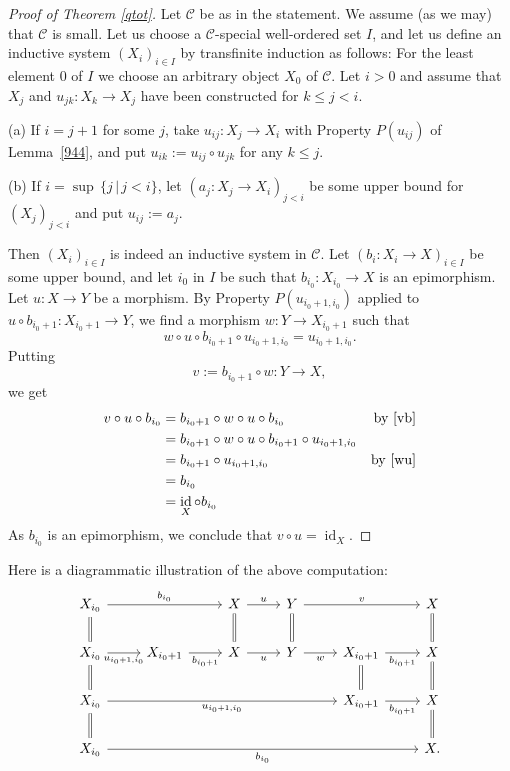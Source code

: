 \documentclass[12pt]{article}%
\theoremstyle{remark}
\theoremstyle{definition}
\newcommand{\nn}{\noindent}
\newcommand{\C}{\mathcal C}
\DeclareMathOperator{\id}{id}
\begin{document}
\begin{proof}[Proof of Theorem \ref{qtot}]
Let $\C$ be as in the statement. We assume (as we may) that $\C$ is small. Let us choose a $\C$-special well-ordered set $I$, and let us define an inductive system $(X_i)_{i\in I}$ by transfinite induction as follows: For the least element $0$ of $I$ we choose an arbitrary object $X_0$ of $\C$. Let $i>0$ and assume that $X_j$ and $u_{jk}:X_k\to X_j$ have been constructed for $k\le j<i$. 

\nn(a) If $i=j+1$ for some $j$, take $u_{ij}:X_j\to X_i$ with Property $P(u_{ij})$ of Lemma~\ref{944}, and put $u_{ik}:=u_{ij}\circ u_{jk}$ for any $k\le j$.

\nn(b) If $i=\sup\,\{j\,|\,j<i\}$, let $(a_j:X_j\to X_i)_{j<i}$ be some upper bound for $(X_j)_{j<i}$ and put $u_{ij}:=a_j$. 

Then $(X_i)_{i\in I}$ is indeed an inductive system in $\C$. Let $(b_i:X_i\to X)_{i\in I}$ be some upper bound, and let $i_0$ in $I$ be such that $b_{i_0}:X_{i_0}\to X$ is an epimorphism. Let $u:X\to Y$ be a morphism. By Property $P(u_{i_0+1,i_0})$ applied to $u\circ b_{i_0+1}:X_{i_0+1}\to Y$, we find a morphism $w:Y\to X_{i_0+1}$ such that 
%
\begin{equation}\label{wu}
w\circ u\circ b_{i_0+1}\circ u_{i_0+1,i_0}=u_{i_0+1,i_0}.
\end{equation}
%
Putting 
%
\begin{equation}\label{vb}
v:=b_{i_0+1}\circ w:Y\to X,
\end{equation}
%
we get 
%
\begin{align*}
v\circ u\circ b_{i_0}&=b_{i_0+1}\circ w\circ u\circ b_{i_0}&\text{by \eqref{vb}}\\ 
&=b_{i_0+1}\circ w\circ u\circ b_{i_0+1}\circ u_{i_0+1,i_0}\\ 
&=b_{i_0+1}\circ u_{i_0+1,i_0}&\text{by \eqref{wu}}\\ 
&=b_{i_0}\\ 
&=\id_X\circ b_{i_0}
\end{align*}
%
As $b_{i_0}$ is an epimorphism, we conclude that $v\circ u=\id_X$.
\end{proof}

Here is a diagrammatic illustration of the above computation:
$$
\begin{tikzcd}
X_{i_0}\ar[equal]{d}\ar{rr}{b_{i_0}}&&X\ar[equal]{d}\ar{r}{u}&Y\ar[equal]{d}\ar{rr}{v}&&X\ar[equal]{d}\\ 
X_{i_0}\ar[equal]{d}\ar{r}[swap]{u_{i_0+1,i_0}}&X_{i_0+1}\ar{r}[swap]{b_{i_0+1}}&X\ar{r}[swap]{u}&Y\ar{r}[swap]{w}&X_{i_0+1}\ar[equal]{d}\ar{r}[swap]{b_{i_0+1}}&X\ar[equal]{d}\\ 
X_{i_0}\ar[equal]{d}\ar{rrrr}[swap]{u_{i_0+1,i_0}}&&&&X_{i_0+1}\ar{r}[swap]{b_{i_0+1}}&X\ar[equal]{d}\\ 
X_{i_0}\ar{rrrrr}[swap]{b_{i_0}}&&&&&X.
\end{tikzcd}
$$ 
\end{document}
